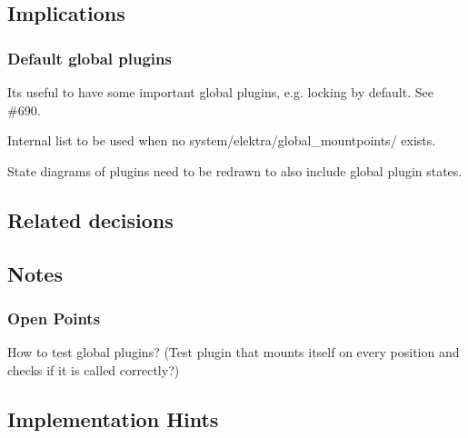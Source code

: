 \subsection*{Implications}

\subsubsection*{Default global plugins}

Its useful to have some important global plugins, e.\+g. locking by default. See \#690.

Internal list to be used when no system/elektra/global\+\_\+mountpoints/ exists.

State diagrams of plugins need to be redrawn to also include global plugin states.

\subsection*{Related decisions}

\subsection*{Notes}

\subsubsection*{Open Points}


\begin{DoxyItemize}
\item How to test global plugins? (Test plugin that mounts itself on every position and checks if it is called correctly?)
\end{DoxyItemize}

\subsection*{Implementation Hints}


